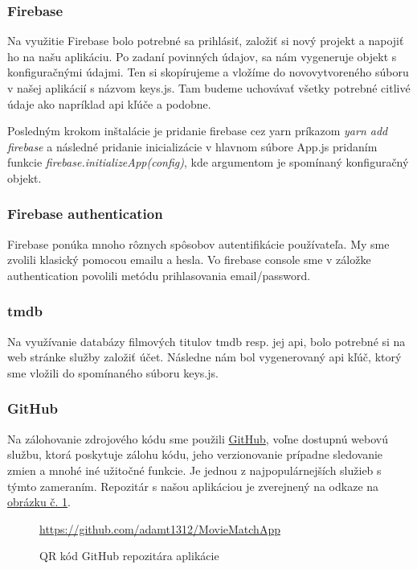 \subsubsection{Firebase}
Na využitie Firebase bolo potrebné sa prihlásiť, založiť si nový projekt a napojiť ho na našu aplikáciu. Po zadaní povinných údajov, sa nám vygeneruje objekt s konfiguračnými údajmi. Ten si skopírujeme a vložíme do novovytvoreného súboru v našej aplikácií s názvom keys.js. Tam budeme uchovávať všetky potrebné citlivé údaje ako napríklad \acrshort{api} kľúče a podobne.

Posledným krokom inštalácie je pridanie firebase cez yarn príkazom \textit{yarn add firebase} a následné pridanie inicializácie v hlavnom súbore App.js pridaním funkcie \textit{firebase.initializeApp(config)}, kde argumentom je spomínaný konfiguračný objekt.
\subsubsection{Firebase authentication}
Firebase ponúka mnoho rôznych spôsobov autentifikácie používateľa. My sme zvolili klasický pomocou emailu a hesla. Vo firebase console sme v záložke authentication povolili metódu prihlasovania email/password. 
\subsubsection{\acrshort{tmdb}}
Na využívanie databázy filmových titulov \acrshort{tmdb} resp. jej \acrshort{api}, bolo potrebné si na web stránke služby založiť účet. Následne nám bol vygenerovaný \acrshort{api} kľúč, ktorý sme vložili do spomínaného súboru keys.js. 
\subsubsection{GitHub}
Na zálohovanie zdrojového kódu sme použili \href{https://github.com/}{GitHub}, voľne dostupnú webovú službu, ktorá poskytuje zálohu kódu, jeho verzionovanie prípadne sledovanie zmien a mnohé iné užitočné funkcie. Je jednou z najpopulárnejších služieb s týmto zameraním. Repozitár s našou aplikáciou je zverejnený na odkaze na \hyperref[ghqrcode]{obrázku č. \ref{ghqrcode}}. 

\begin{figure}[hbt!]
  \centering   
  \def\stackalignment{c}
           {\scriptsize%
            \url{https://github.com/adamt1312/MovieMatchApp}}
	\caption{QR kód GitHub repozitára aplikácie}  
  \label{ghqrcode}
\end{figure}
